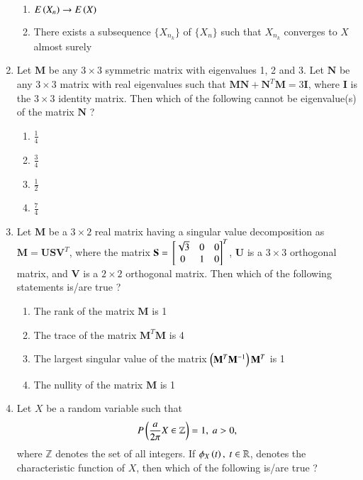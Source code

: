 \documentclass[journal]{IEEEtran}
\begin{document}
\begin{enumerate}
\begin{enumerate}
    \item $E\left(X_n\right) \rightarrow E\left(X\right)$
    \item There exists a subsequence $\{X_{n_k}\}$ of $\{X_n\}$ such that $X_{n_k}$ converges to $X$ almost surely \\
\end{enumerate}
\item Let $\mathbf{M}$ be any $3 \times 3$ symmetric matrix with eigenvalues 1, 2 and 3. Let $\mathbf{N}$ be any $3 \times 3$ matrix with real eigenvalues such that $\mathbf{MN} + \mathbf{N}^T\mathbf{M} = 3\mathbf{I}$, where $\mathbf{I}$ is the $3 \times 3$ identity matrix. Then which of the following cannot be eigenvalue(s) of the matrix $\mathbf{N}$ ? 
\begin{enumerate}
    \item $\frac{1}{4}$
    \item $\frac{3}{4}$
    \item $\frac{1}{2}$
    \item $\frac{7}{4}$ \\
\end{enumerate}
\item Let $\mathbf{M}$ be a $3 \times 2$ real matrix having a singular value decomposition as $\mathbf{M} = \mathbf{USV}^T$, where the matrix $\mathbf{S} = {}\left[\begin{matrix}
    \sqrt{3} & 0 & 0 \\ 0 & 1 & 0
\end{matrix}\right]^T$, $\mathbf{U}$ is a $3 \times 3$ orthogonal matrix, and $\mathbf{V}$ is a $2 \times 2$ orthogonal matrix. Then which of the following statements is/are true ? 
\begin{enumerate}
    \item The rank of the matrix $\mathbf{M}$ is 1
    \item The trace of the matrix $\mathbf{M}^T\mathbf{M}$ is 4
    \item The largest singular value of the matrix $\left(\mathbf{M}^T\mathbf{M}^{-1}\right)\mathbf{M}^T$ is 1
    \item The nullity of the matrix $\mathbf{M}$ is 1 \\ 
\end{enumerate}
\item Let $X$ be a random variable such that 
\begin{align*}
    P\left(\frac{a}{2\pi}X \in \mathbb{Z}\right) = 1,\ a > 0,
\end{align*}
where $\mathbb{Z}$ denotes the set of all integers. If $\phi_X\left(t\right),\ t \in \mathbb{R}$, denotes the characteristic function of $X$, then which of the following is/are true ? 

\end{enumerate}
\end{document}
